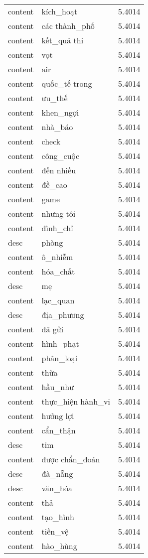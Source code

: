 \documentclass{article}
\begin{document}
\begin{tabular}{lll}
content & kích\_hoạt & 5.4014\\
content & các thành\_phố & 5.4014\\
content & kết\_quả thi & 5.4014\\
content & vọt & 5.4014\\
content & air & 5.4014\\
content & quốc\_tế trong & 5.4014\\
content & ưu\_thế & 5.4014\\
content & khen\_ngợi & 5.4014\\
content & nhà\_báo & 5.4014\\
content & check & 5.4014\\
content & công\_cuộc & 5.4014\\
content & đến nhiều & 5.4014\\
content & đề\_cao & 5.4014\\
content & game & 5.4014\\
content & nhưng tôi & 5.4014\\
content & đình\_chỉ & 5.4014\\
desc & phòng & 5.4014\\
content & ô\_nhiễm & 5.4014\\
content & hóa\_chất & 5.4014\\
desc & mẹ & 5.4014\\
content & lạc\_quan & 5.4014\\
desc & địa\_phương & 5.4014\\
content & đã gửi & 5.4014\\
content & hình\_phạt & 5.4014\\
content & phân\_loại & 5.4014\\
content & thừa & 5.4014\\
content & hầu\_như & 5.4014\\
content & thực\_hiện hành\_vi & 5.4014\\
content & hưởng lợi & 5.4014\\
content & cẩn\_thận & 5.4014\\
desc & tim & 5.4014\\
content & được chẩn\_đoán & 5.4014\\
desc & đà\_nẵng & 5.4014\\
desc & văn\_hóa & 5.4014\\
content & thả & 5.4014\\
content & tạo\_hình & 5.4014\\
content & tiền\_vệ & 5.4014\\
content & hào\_hùng & 5.4014\\

\end{tabular}
\end{document}
